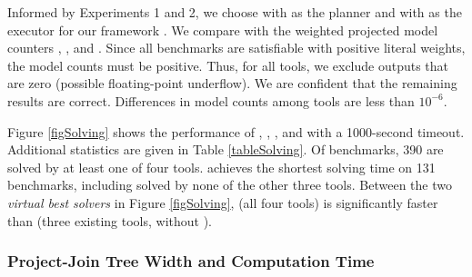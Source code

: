 Informed by Experiments 1 and 2, we choose \Lg{} with \flowcutter{} as the planner and \dmc{} with \mcs{} as the executor for our framework \procount.
We compare \procount{} with the weighted projected model counters \dfp{}, \projmc{}, and \ssat{}.
Since all benchmarks are satisfiable
with positive literal weights, the model counts must be positive.
Thus, for all tools, we exclude outputs that are zero (possible floating-point underflow).
We are confident that the remaining results are correct.
Differences in model counts among tools are less than $10^{-6}$.

Figure \ref{figSolving} shows the performance of \procount{}, \dfp{}, \projmc{}, and \ssat{} with a 1000-second timeout. 
Additional statistics are given in Table \ref{tableSolving}. 
Of \benchmarks{} benchmarks, 390 are solved by at least one of four tools.
\procount{} achieves the shortest solving time on 131 benchmarks, including \dpmcUniqueBenchmarks{} solved by none of the other three tools.
Between the two \emph{virtual best solvers} in Figure \ref{figSolving},  (all four tools) is significantly faster than  (three existing tools, without \procount).




\subsubsection{Project-Join Tree Width and Computation Time}


